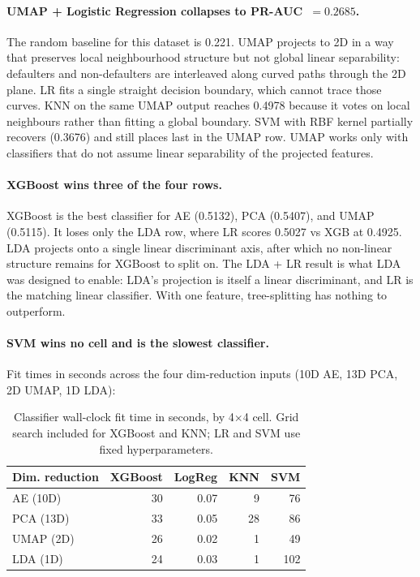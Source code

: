 \documentclass[12pt,a4paper]{article}
\begin{document}
\paragraph{UMAP + Logistic Regression collapses to PR-AUC~$= 0.2685$.}
The random baseline for this dataset is 0.221. UMAP projects to 2D in a
way that preserves local neighbourhood structure but not global linear
separability: defaulters and non-defaulters are interleaved along curved
paths through the 2D plane. LR fits a single straight decision boundary,
which cannot trace those curves. KNN on the same UMAP output reaches
0.4978 because it votes on local neighbours rather than fitting a global
boundary. SVM with RBF kernel partially recovers (0.3676) and still places
last in the UMAP row. UMAP works only with classifiers that do not assume
linear separability of the projected features.

\paragraph{XGBoost wins three of the four rows.}
XGBoost is the best classifier for AE (0.5132), PCA (0.5407), and UMAP
(0.5115). It loses only the LDA row, where LR scores 0.5027 vs XGB at
0.4925. LDA projects onto a single linear discriminant axis, after which no
non-linear structure remains for XGBoost to split on. The LDA + LR result
is what LDA was designed to enable: LDA's projection is itself a linear
discriminant, and LR is the matching linear classifier. With one feature,
tree-splitting has nothing to outperform.

\paragraph{SVM wins no cell and is the slowest classifier.}
Fit times in seconds across the four dim-reduction inputs (10D AE, 13D PCA,
2D UMAP, 1D LDA):

\begin{table}[H]
\centering
\caption{Classifier wall-clock fit time in seconds, by 4$\times$4 cell. Grid
         search included for XGBoost and KNN; LR and SVM use fixed
         hyperparameters.}
\label{tab:matrix_fit_sec}
\small
\begin{tabular}{lrrrr}
\toprule
Dim. reduction & XGBoost & LogReg & KNN & SVM \\
\midrule
AE (10D)   &  30 & 0.07 &  9 &  76 \\
PCA (13D)  &  33 & 0.05 & 28 &  86 \\
UMAP (2D)  &  26 & 0.02 &  1 &  49 \\
LDA (1D)   &  24 & 0.03 &  1 & 102 \\
\bottomrule
\end{tabular}
\end{table}
\end{document}
